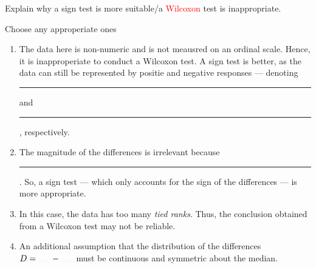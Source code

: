 \documentclass[../Notes.tex]{subfiles}
\begin{document}
\begin{note}
  Explain why a sign test is more suitable/a \textcolor{red}{Wilcoxon} test is inappropriate.
  \begin{center}
    \parbox{0.9\textwidth}{
      Choose any approperiate ones
      \begin{enumerate}
        \item The data here is non-numeric and is not meausred on an ordinal scale. Hence, it is inapproperiate to conduct a Wilcoxon test. A sign test is better, as the data can still be represented by positie and negative responses --- denoting \rule{1cm}{0.01mm} and \rule{1cm}{0.01mm}, respectively.
        \item The magnitude of the differences is irrelevant because \rule{1cm}{0.01mm}. So, a sign test --- which only accounts for the sign of the differences --- is more appropriate.
        \item In this case, the data has too many \emph{tied ranks}. Thus, the conclusion obtained from a Wilcoxon test may not be reliable.
        \item An additional assumption that the distribution of the differences \(D=\rule{0.5cm}{0.01mm}-\rule{0.5cm}{0.01mm}\) must be continuous and symmetric about the median. 
      \end{enumerate}
    }
  \end{center}
\end{note}
\end{document}
